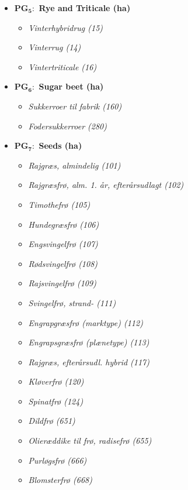 \documentclass[12pt]{article}
\begin{document}
\begin{itemize}
    \item[] \textbf{PG$_\textbf{5}:$ Rye and Triticale (ha)}
    \begin{itemize}
        \item[$+$] \textit{Vinterhybridrug (15)}
        \item[$+$] \textit{Vinterrug (14)}
        \item[$+$] \textit{Vintertriticale (16)}
    \end{itemize}
    \item[] \textbf{PG$_\textbf{6}:$ Sugar beet (ha)}
    \begin{itemize}
        \item[$+$] \textit{Sukkerroer til fabrik (160)}
        \item[$+$] \textit{Fodersukkerroer (280)}
    \end{itemize}
    \item[] \textbf{PG$_\textbf{7}:$ Seeds (ha)}
    \begin{itemize}
        \item[$+$] \textit{Rajgræs, almindelig (101)}
        \item[$+$] \textit{Rajgræsfrø, alm. 1. år, efterårsudlagt (102)}
        \item[$+$] \textit{Timothefrø (105)}
        \item[$+$] \textit{Hundegræsfrø (106)}
        \item[$+$] \textit{Engsvingelfrø (107)}
        \item[$+$] \textit{Rødsvingelfrø (108)}
        \item[$+$] \textit{Rajsvingelfrø (109)}
        \item[$+$] \textit{Svingelfrø, strand- (111)}
        \item[$+$] \textit{Engrapgræsfrø (marktype) (112)}
        \item[$+$] \textit{Engrapsgræsfrø (plænetype) (113)}
        \item[$+$] \textit{Rajgræs, efterårsudl. hybrid (117)}
        \item[$+$] \textit{Kløverfrø (120)}
        \item[$+$] \textit{Spinatfrø (124)}
        \item[$+$] \textit{Dildfrø (651)}
        \item[$+$] \textit{Olieræddike til frø, radisefrø (655)}
        \item[$+$] \textit{Purløgsfrø (666)}
        \item[$+$] \textit{Blomsterfrø (668)}
    \end{itemize}

\end{itemize}
\end{document}
